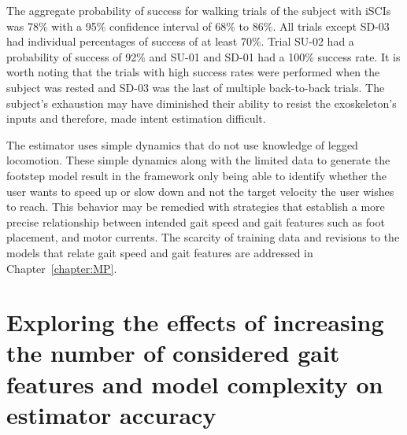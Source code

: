 The aggregate probability of success for walking trials of the subject with iSCIs was 78\% with a 95\% confidence interval of 68\% to 86\%. All trials except SD-03 had individual percentages of success of at least 70\%. Trial SU-02 had a probability of success of 92\% and SU-01 and SD-01 had a 100\% success rate. It is worth noting that the trials with high success rates were performed when the subject was rested and SD-03 was the last of multiple back-to-back trials. The subject's exhaustion may have diminished their ability to resist the exoskeleton's inputs and therefore, made intent estimation difficult.

The estimator uses simple dynamics that do not use knowledge of legged locomotion. These simple dynamics along with the limited data to generate the footstep model result in the framework only being able to identify whether the user wants to speed up or slow down and not the target velocity the user wishes to reach. This behavior may be remedied with strategies that establish a more precise relationship between intended gait speed and gait features such as foot placement, and motor currents. The scarcity of training data and revisions to the models that relate gait speed and gait features are addressed in Chapter~\ref{chapter:MP}.

\section{Exploring the effects of increasing the number of considered gait features and model complexity on estimator accuracy}\label{sec:add_analysis}

